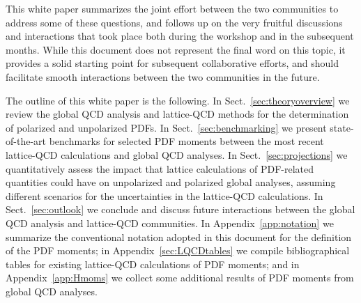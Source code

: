 This white paper summarizes the joint effort between the two communities to 
address some of these questions, and follows up on the very fruitful 
discussions and interactions that took place both during 
the workshop and in the subsequent months.
%
While this document does not represent the final word on this topic, it 
provides a solid starting point for subsequent collaborative efforts, and 
should facilitate smooth interactions between the two communities in the future.

The outline of this white paper is the following.
%
In Sect.~\ref{sec:theoryoverview} we review the global QCD analysis and 
lattice-QCD methods for the determination of polarized and unpolarized PDFs.
%
In Sect.~\ref{sec:benchmarking} we present state-of-the-art benchmarks 
for selected PDF moments between the most recent lattice-QCD calculations and 
global QCD analyses.
%
In Sect.~\ref{sec:projections} we quantitatively assess the impact that
lattice calculations of PDF-related quantities could have on unpolarized
and polarized global analyses, assuming different scenarios for the 
uncertainties in the lattice-QCD calculations.
%
In Sect.~\ref{sec:outlook} we conclude
and discuss future interactions between
the global QCD analysis and lattice-QCD communities.
%
In Appendix~\ref{app:notation} we summarize the conventional notation
adopted in this document for the definition of the PDF moments; 
in Appendix~\ref{sec:LQCDtables} we compile bibliographical tables for
existing lattice-QCD calculations of PDF moments;
and in Appendix~\ref{app:Hmoms} we collect some
additional results of PDF moments from global QCD analyses.

